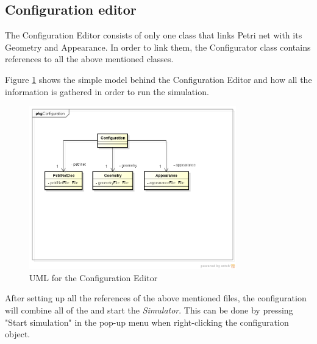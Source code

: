 \subsection{Configuration editor}
\label{sec:arch-configuration}

The Configuration Editor consists of only one class that links Petri net with its Geometry and Appearance.
In order to link them, the Configurator class contains references to all the above mentioned classes. 

Figure \ref{fig:uml-configuration-editor} shows the simple model behind the Configuration Editor and how all the information is gathered in order to run the simulation. 

\begin{figure}[htp]
\begin{center}
  \includegraphics[width=0.8\textwidth]{image/configuration-model.png}
  \caption{UML for the Configuration Editor}
  \label{fig:uml-configuration-editor}
\end{center}
\end{figure}

After setting up all the references of the above mentioned files, the configuration will combine all of the and start the \textit{Simulator}. This can be done by pressing "Start simulation" in the pop-up menu when right-clicking the configuration object.
